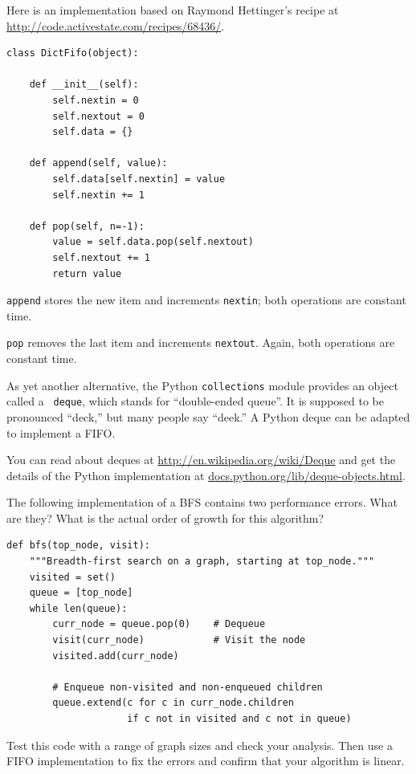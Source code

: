 \documentclass[10pt]{book}
\begin{document}
Here is an implementation based on Raymond Hettinger's recipe
at \url{http://code.activestate.com/recipes/68436/}.

\begin{verbatim}
class DictFifo(object):

    def __init__(self):
        self.nextin = 0
        self.nextout = 0
        self.data = {}

    def append(self, value):
        self.data[self.nextin] = value
        self.nextin += 1

    def pop(self, n=-1):
        value = self.data.pop(self.nextout)
        self.nextout += 1
        return value
\end{verbatim}

{\tt append} stores the new item and increments {\tt nextin};
both operations are constant time.

{\tt pop} removes the last item and increments {\tt nextout}.  Again,
both operations are constant time.

As yet another alternative,
the Python {\tt collections} module provides an object called a {\tt
  deque}, which stands for ``double-ended queue''.  It is supposed to
be pronounced ``deck,'' but many people say ``deek.''  A Python deque
can be adapted to implement a FIFO.

You can read about deques at \url{http://en.wikipedia.org/wiki/Deque}
and get the details of the Python implementation at
\url{docs.python.org/lib/deque-objects.html}.


\begin{exercise}

The following implementation of a BFS
contains two performance errors.  What are
they?  What is the actual order of growth for this algorithm?

\begin{verbatim}
def bfs(top_node, visit):
    """Breadth-first search on a graph, starting at top_node."""
    visited = set()
    queue = [top_node]
    while len(queue):
        curr_node = queue.pop(0)    # Dequeue
        visit(curr_node)            # Visit the node
        visited.add(curr_node)

        # Enqueue non-visited and non-enqueued children
        queue.extend(c for c in curr_node.children
                     if c not in visited and c not in queue)
\end{verbatim}

Test this code with a range of graph sizes and check your analysis.
Then use a FIFO implementation to fix the errors and confirm
that your algorithm is linear.

\end{exercise}
\end{document}
